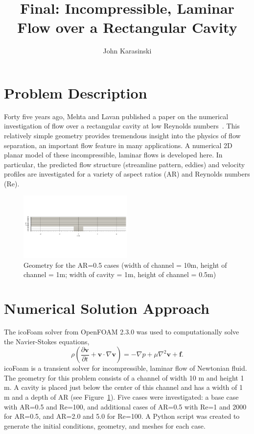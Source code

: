 \documentclass[twocolumn,10pt]{asme2ej}
\title{Final: Incompressible, Laminar Flow over a Rectangular Cavity}
\author{John Karasinski
    \affiliation{
  Graduate Student Researcher\\
  Center for Human/Robotics/Vehicle Integration and Performance\\
  Department of Mechanical and Aerospace Engineering\\
  University of California\\
  Davis, California 95616\\
    Email: karasinski@ucdavis.edu
    }
}
\begin{document}
\maketitle

\section{Problem Description}

Forty five years ago, Mehta and Lavan published a paper on the numerical investigation of flow over a rectangular cavity at low Reynolds numbers~\cite{mehta1969flow}. This relatively simple geometry provides tremendous insight into the physics of flow separation, an important flow feature in many applications. A numerical 2D planar model of these incompressible, laminar flows is developed here. In particular, the predicted flow structure (streamline pattern, eddies) and velocity profiles are investigated for a variety of aspect ratios (AR) and Reynolds numbers (Re).

\begin{figure}[b]
\begin{center}
\includegraphics[width=0.5\textwidth]{figure/geometry.pdf}
\caption{Geometry for the AR=0.5 cases (width of channel = 10m, height of channel = 1m; width of cavity = 1m, height of channel = 0.5m)}
\label{geometry_figure}
\end{center}
\end{figure}

\section{Numerical Solution Approach}

The icoFoam solver from OpenFOAM 2.3.0 was used to computationally solve the Navier-Stokes equations,
\begin{equation}
\rho \left(\frac{\partial \mathbf{v}}{\partial t} + \mathbf{v} \cdot \nabla \mathbf{v}\right) = -\nabla p + \mu \nabla^2 \mathbf{v} + \mathbf{f}.
\end{equation}
\noindent icoFoam is a transient solver for incompressible, laminar flow of Newtonian fluid. The geometry for this problem consists of a channel of width 10 m and height 1 m. A cavity is placed just below the center of this channel and has a width of 1 m and a depth of AR (see Figure~\ref{geometry_figure}). Five cases were investigated: a base case with AR=0.5 and Re=100, and additional cases of AR=0.5 with Re=1 and 2000 for AR=0.5, and AR=2.0 and 5.0 for Re=100. A Python script was created to generate the initial conditions, geometry, and meshes for each case.
\end{document}
